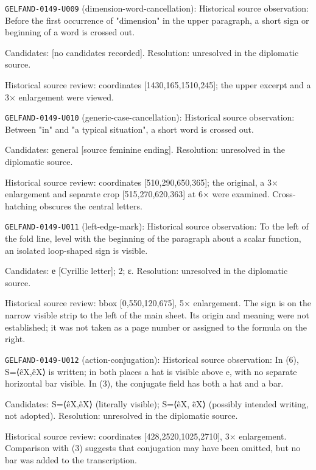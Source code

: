 \noindent\texttt{GELFAND-0149-U009} (dimension-word-cancellation): Historical source observation: Before the first occurrence of "dimension" in the upper paragraph, a short sign or beginning of a word is crossed out.\par
Candidates: [no candidates recorded]. Resolution: unresolved in the diplomatic source.\par
Historical source review: coordinates [1430,165,1510,245]; the upper excerpt and a 3× enlargement were viewed.\par

\noindent\texttt{GELFAND-0149-U010} (generic-case-cancellation): Historical source observation: Between "in" and "a typical situation", a short word is crossed out.\par
Candidates: general [source feminine ending]. Resolution: unresolved in the diplomatic source.\par
Historical source review: coordinates [510,290,650,365]; the original, a 3× enlargement and separate crop [515,270,620,363] at 6× were examined. Cross-hatching obscures the central letters.\par

\noindent\texttt{GELFAND-0149-U011} (left-edge-mark): Historical source observation: To the left of the fold line, level with the beginning of the paragraph about a scalar function, an isolated loop-shaped sign is visible.\par
Candidates: е [Cyrillic letter]; 2; ε. Resolution: unresolved in the diplomatic source.\par
Historical source review: bbox [0,550,120,675], 5× enlargement. The sign is on the narrow visible strip to the left of the main sheet. Its origin and meaning were not established; it was not taken as a page number or assigned to the formula on the right.\par

\noindent\texttt{GELFAND-0149-U012} (action-conjugation): Historical source observation: In (6), S=⟨êX,êX⟩ is written; in both places a hat is visible above e, with no separate horizontal bar visible. In (3), the conjugate field has both a hat and a bar.\par
Candidates: S=⟨êX,êX⟩ (literally visible); S=⟨êX, ē̂X⟩ (possibly intended writing, not adopted). Resolution: unresolved in the diplomatic source.\par
Historical source review: coordinates [428,2520,1025,2710], 3× enlargement. Comparison with (3) suggests that conjugation may have been omitted, but no bar was added to the transcription.\par

